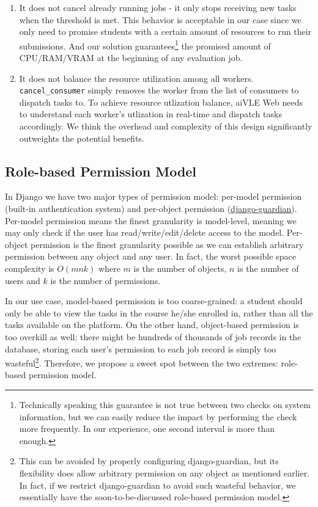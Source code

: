 \begin{enumerate}
    \item It does not cancel already running jobs - it only stops receiving new tasks when the threshold is met. This behavior is acceptable in our case since we only need to promise students with a certain amount of resources to run their submissions. And our solution guarantees\footnote{Technically speaking this guarantee is not true between two checks on system information, but we can easily reduce the impact by performing the check more frequently. In our experience, one second interval is more than enough.} the promised amount of CPU/RAM/VRAM at the beginning of any evaluation job.
    \item It does not balance the resource utilization among all workers. \texttt{cancel\_consumer} simply removes the worker from the list of consumers to dispatch tasks to. To achieve resource utlization balance, aiVLE Web needs to understand each worker's utlization in real-time and dispatch tasks accordingly. We think the overhead and complexity of this design significantly outweights the potential benefits.
\end{enumerate}

\subsection{Role-based Permission Model}
\label{ss:aivle-web-permission-model}
In Django we have two major types of permission model: per-model permission (built-in authentication system) and per-object permission (\href{https://github.com/django-guardian/django-guardian}{django-guardian}). Per-model permission means the finest granularity is model-level, meaning we may only check if the user has read/write/edit/delete access to the model. Per-object permission is the finest granularity possible as we can establish arbitrary permission between any object and any user. In fact, the worst possible space complexity is $O(mnk)$ where $m$ is the number of objects, $n$ is the number of users and $k$ is the number of permissions.

In our use case, model-based permission is too coarse-grained: a student should only be able to view the tasks in the course he/she enrolled in, rather than all the tasks available on the platform. On the other hand, object-based permission is too overkill as well: there might be hundreds of thousands of job records in the database, storing each user's permission to each job record is simply too wasteful\footnote{This can be avoided by properly configuring django-guardian, but its flexibility does allow arbitrary permission on any object as mentioned earlier. In fact, if we restrict django-guardian to avoid such wasteful behavior, we essentially have the soon-to-be-discussed role-based permission model.}. Therefore, we propose a sweet spot between the two extremes: role-based permission model.

